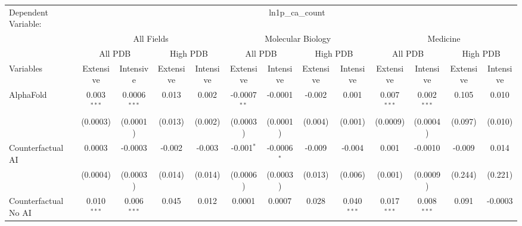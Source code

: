 \begingroup
\centering
\begin{tabular}{lcccccccccccc}
   \tabularnewline \midrule \midrule
   Dependent Variable: & \multicolumn{12}{c}{ln1p\_ca\_count}\\
 & \multicolumn{4}{c}{All Fields} & \multicolumn{4}{c}{Molecular Biology} & \multicolumn{4}{c}{Medicine} \\
\cmidrule(lr){2-5} \cmidrule(lr){6-9} \cmidrule(lr){10-13}
 & \multicolumn{2}{c}{All PDB} & \multicolumn{2}{c}{High PDB} & \multicolumn{2}{c}{All PDB} & \multicolumn{2}{c}{High PDB} & \multicolumn{2}{c}{All PDB} & \multicolumn{2}{c}{High PDB} \\
\cmidrule(lr){2-3} \cmidrule(lr){4-5} \cmidrule(lr){6-7} \cmidrule(lr){8-9} \cmidrule(lr){10-11} \cmidrule(lr){12-13}
Variables & \multicolumn{1}{c}{Extensive} & \multicolumn{1}{c}{Intensive} & \multicolumn{1}{c}{Extensive} & \multicolumn{1}{c}{Intensive} & \multicolumn{1}{c}{Extensive} & \multicolumn{1}{c}{Intensive} & \multicolumn{1}{c}{Extensive} & \multicolumn{1}{c}{Intensive} & \multicolumn{1}{c}{Extensive} & \multicolumn{1}{c}{Intensive} & \multicolumn{1}{c}{Extensive} & \multicolumn{1}{c}{Intensive} \\
\cmidrule(lr){1-1}\cmidrule(lr){2-2} \cmidrule(lr){3-3} \cmidrule(lr){4-4} \cmidrule(lr){5-5} \cmidrule(lr){6-6} \cmidrule(lr){7-7} \cmidrule(lr){8-8} \cmidrule(lr){9-9} \cmidrule(lr){10-10} \cmidrule(lr){11-11} \cmidrule(lr){12-12} \cmidrule(lr){13-13}
   AlphaFold                                & 0.003$^{***}$ & 0.0006$^{***}$  & 0.013        & 0.002    & -0.0007$^{**}$ & -0.0001       & -0.002  & 0.001          & 0.007$^{***}$ & 0.002$^{***}$   & 0.105   & 0.010\\   
                                            & (0.0003)      & (0.0001)        & (0.013)      & (0.002)  & (0.0003)       & (0.0001)      & (0.004) & (0.001)        & (0.0009)      & (0.0004)        & (0.097) & (0.010)\\   
   Counterfactual AI                        & 0.0003        & -0.0003         & -0.002       & -0.003   & -0.001$^{*}$   & -0.0006$^{*}$ & -0.009  & -0.004         & 0.001         & -0.0010         & -0.009  & 0.014\\   
                                            & (0.0004)      & (0.0003)        & (0.014)      & (0.014)  & (0.0006)       & (0.0003)      & (0.013) & (0.006)        & (0.001)       & (0.0009)        & (0.244) & (0.221)\\   
   Counterfactual No AI                     & 0.010$^{***}$ & 0.006$^{***}$   & 0.045        & 0.012    & 0.0001         & 0.0007        & 0.028   & 0.040$^{***}$  & 0.017$^{***}$ & 0.008$^{***}$   & 0.091   & -0.0003\\   

\end{tabular}
